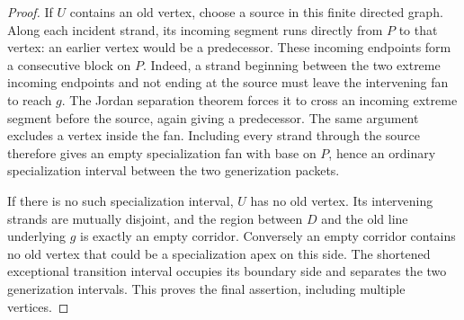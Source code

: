 \documentclass[11pt,a4paper]{article}
\begin{document}
\begin{proof}
If $U$ contains an old vertex, choose a source in this finite directed
graph. Along each incident strand, its incoming segment runs directly
from $P$ to that vertex: an earlier vertex would be a predecessor.
These incoming endpoints form a consecutive block on $P$. Indeed, a
strand beginning between the two extreme incoming endpoints and not
ending at the source must leave the intervening fan to reach $g$.
The Jordan separation theorem forces it to cross an incoming extreme
segment before the source, again giving a predecessor. The same
argument excludes a vertex inside the fan. Including every strand
through the source therefore gives an empty specialization fan with
base on $P$, hence an ordinary specialization interval between the
two generization packets.

If there is no such specialization interval, $U$ has no old vertex.
Its intervening strands are mutually disjoint, and the region between
$D$ and the old line underlying $g$ is exactly an empty corridor.
Conversely an empty corridor contains no old vertex that could be a
specialization apex on this side. The shortened exceptional transition
interval occupies its boundary side and separates the two generization
intervals. This proves the final assertion, including multiple vertices.
\end{proof}
\end{document}
